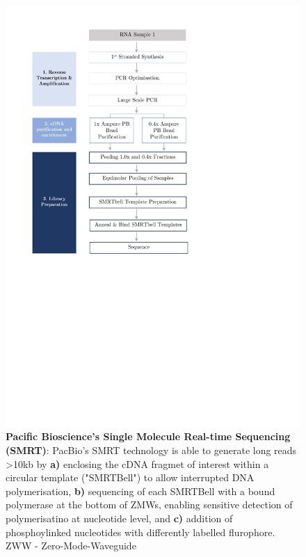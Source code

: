 \begin{figure}[h!]
	\centering
	\includegraphics[page=14,trim={0 5cm 0 0 },clip, scale = 0.7]{Figures/ProjectDevelopment_Figures.pdf}
	\captionsetup{width=0.95\textwidth}
	\caption[Pacific Bioscience's Single Molecule Real-time Sequencing]%
	{\textbf{Pacific Bioscience's Single Molecule Real-time Sequencing (SMRT)}: PacBio's SMRT technology is able to generate long reads >10kb by \textbf{a)} enclosing the cDNA fragmet of interest within a circular template ("SMRTBell") to allow interrupted DNA polymerisation, \textbf{b)} sequencing of each SMRTBell with a bound polymerase at the bottom of ZMWs, enabling sensitive detection of polymerisatino at nucleotide level, and \textbf{c)} addition of phosphoylinked nucleotides with differently labelled flurophore. ZWW - Zero-Mode-Waveguide}
	\label{fig:Mechanism}
\end{figure}


